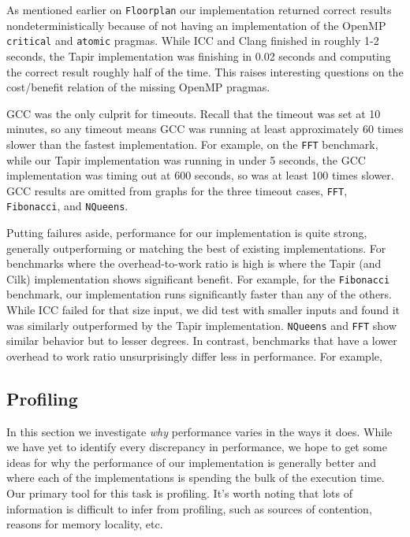 \documentclass[sigconf]{acmart}
\begin{document}
As mentioned earlier on \texttt{Floorplan} our implementation returned correct
results nondeterministically because of not having an implementation of the OpenMP
\texttt{critical} and \texttt{atomic} pragmas. While ICC and Clang finished in
roughly 1-2 seconds, the Tapir implementation was finishing in 0.02 seconds
and computing the correct result roughly half of the time. This raises interesting
questions on the cost/benefit relation of the missing OpenMP pragmas.

GCC was the only culprit for timeouts. Recall that the timeout was set at 10
minutes, so any timeout means GCC was running at least approximately 60 times
slower than the fastest implementation. For example, on the \texttt{FFT}
benchmark, while our Tapir implementation was running in under 5 seconds, the
GCC implementation was timing out at 600 seconds, so was at least 100 times
slower. GCC results are omitted from graphs for the three timeout cases,
\texttt{FFT}, \texttt{Fibonacci}, and \texttt{NQueens}.

Putting failures aside, performance for our implementation is quite strong,
generally outperforming or matching the best of existing implementations. For
benchmarks where the overhead-to-work ratio is high is where the Tapir (and 
Cilk) implementation shows significant benefit. For example, for the \texttt{Fibonacci}
benchmark, our implementation runs significantly faster than any of the
others. While ICC failed for that size input, we did test with smaller inputs
and found it was similarly outperformed by the Tapir implementation.  \texttt{NQueens}
and \texttt{FFT} show similar behavior but to lesser degrees. In contrast,
benchmarks that have a lower overhead to work ratio unsurprisingly differ less
in performance. For example,


\subsection{Profiling}

In this section we investigate \emph{why} performance varies in the ways it
does. While we have yet to identify every discrepancy in performance, we hope
to get some ideas for why the performance of our implementation is generally
better and where each of the implementations is spending the bulk of the
execution time. Our primary tool for this task is profiling. It's worth noting
that lots of information is difficult to infer from profiling, such as sources
of contention, reasons for memory locality, etc.
\end{document}
